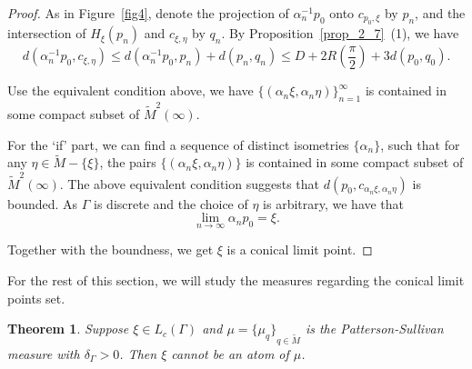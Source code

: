 \documentclass[reqno,11pt]{article}
\newtheorem{theorem}{Theorem}[section]
\theoremstyle{definition}
\theoremstyle{remark}
\numberwithin{equation}{section}
\begin{document}
\begin{proof}
	As in Figure~\ref{fig4}, denote the projection of $\alpha_n^{-1}p_0$ onto $c_{p_0,\xi}$ by $p_n$, and the intersection of $H_{\xi}(p_n)$ and $c_{\xi,\eta}$ by $q_n$. By Proposition~\ref{prop_2_7}~(1), we have
	\begin{displaymath}
        d(\alpha_n^{-1}p_0, c_{\xi,\eta})\leq d(\alpha_n^{-1}p_0,p_n)+d(p_n,q_n)\leq D+2R(\frac{\pi}{2})+3d(p_0,q_0).
	\end{displaymath}

	Use the equivalent condition above, we have ${\{(\alpha_n\xi,\alpha_n\eta)\}}_{n=1}^\infty$ is contained in some compact subset of $\widetilde{M}^2(\infty)$.

	For the `if' part, we can find a sequence of distinct isometries $\{\alpha_n\}$, such that for any $\eta\in\widetilde{M}-\{\xi\}$, the pairs $\{(\alpha_n\xi,\alpha_n\eta)\}$ is contained in some compact subset of $\widetilde{M}^2(\infty)$. The above equivalent condition suggests that $d(p_0,c_{\alpha_n\xi,\alpha_n\eta})$ is bounded. As $\Gamma$ is discrete and the choice of $\eta$ is arbitrary, we have that
	\begin{displaymath}
		\lim_{n\to\infty}\alpha_n p_0=\xi.
	\end{displaymath}

	Together with the boundness, we get $\xi$ is a conical limit point.
\end{proof}

For the rest of this section, we will study the measures regarding the conical limit points set.

\begin{theorem}\label{thm_5_4}
	Suppose $\xi\in L_c(\Gamma)$ and $\mu={\{\mu_q\}}_{q\in\widetilde{M}}$ is the Patterson-Sullivan measure with $\delta_\Gamma>0$. Then $\xi$ cannot be an atom of $\mu$.
\end{theorem}
\end{document}
